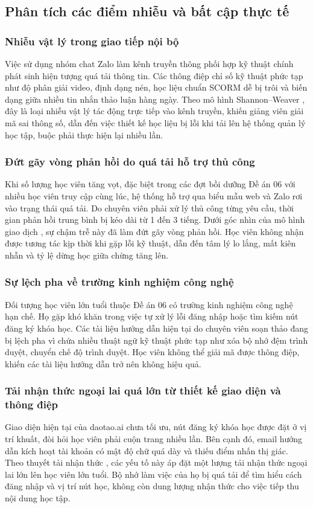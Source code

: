 \subsection{Phân tích các điểm nhiễu và bất cập thực tế}

\subsubsection{Nhiễu vật lý trong giao tiếp nội bộ}
Việc sử dụng nhóm chat Zalo làm kênh truyền thông phối hợp kỹ thuật chính phát sinh hiện tượng quá tải thông tin. Các thông điệp chỉ số kỹ thuật phức tạp như độ phân giải video, định dạng nén, học liệu chuẩn SCORM dễ bị trôi và biến dạng giữa nhiều tin nhắn thảo luận hàng ngày. Theo mô hình Shannon–Weaver \parencite{shannon1949}, đây là loại nhiễu vật lý tác động trực tiếp vào kênh truyền, khiến giảng viên giải mã sai thông số, dẫn đến việc thiết kế học liệu bị lỗi khi tải lên hệ thống quản lý học tập, buộc phải thực hiện lại nhiều lần.

\subsubsection{Đứt gãy vòng phản hồi do quá tải hỗ trợ thủ công}
Khi số lượng học viên tăng vọt, đặc biệt trong các đợt bồi dưỡng Đề án 06 với nhiều học viên truy cập cùng lúc, hệ thống hỗ trợ qua biểu mẫu web và Zalo rơi vào trạng thái quá tải. Do chuyên viên phải xử lý thủ công từng yêu cầu, thời gian phản hồi trung bình bị kéo dài từ 1 đến 3 tiếng. Dưới góc nhìn của mô hình giao dịch \parencite{barnlund2008}, sự chậm trễ này đã làm đứt gãy vòng phản hồi. Học viên không nhận được tương tác kịp thời khi gặp lỗi kỹ thuật, dẫn đến tâm lý lo lắng, mất kiên nhẫn và tỷ lệ dừng học giữa chừng tăng lên.

\subsubsection{Sự lệch pha về trường kinh nghiệm công nghệ}
Đối tượng học viên lớn tuổi thuộc Đề án 06 có trường kinh nghiệm công nghệ hạn chế. Họ gặp khó khăn trong việc tự xử lý lỗi đăng nhập hoặc tìm kiếm nút đăng ký khóa học. Các tài liệu hướng dẫn hiện tại do chuyên viên soạn thảo đang bị lệch pha vì chứa nhiều thuật ngữ kỹ thuật phức tạp như xóa bộ nhớ đệm trình duyệt, chuyển chế độ trình duyệt. Học viên không thể giải mã được thông điệp, khiến các tài liệu hướng dẫn trở nên không hiệu quả.

\subsubsection{Tải nhận thức ngoại lai quá lớn từ thiết kế giao diện và thông điệp}
Giao diện hiện tại của daotao.ai chưa tối ưu, nút đăng ký khóa học được đặt ở vị trí khuất, đòi hỏi học viên phải cuộn trang nhiều lần. Bên cạnh đó, email hướng dẫn kích hoạt tài khoản có mật độ chữ quá dày và thiếu điểm nhấn thị giác. Theo thuyết tải nhận thức \parencite{sweller1988}, các yếu tố này áp đặt một lượng tải nhận thức ngoại lai lớn lên học viên lớn tuổi. Bộ nhớ làm việc của họ bị quá tải để tìm hiểu cách đăng nhập và vị trí nút học, không còn dung lượng nhận thức cho việc tiếp thu nội dung học tập.
